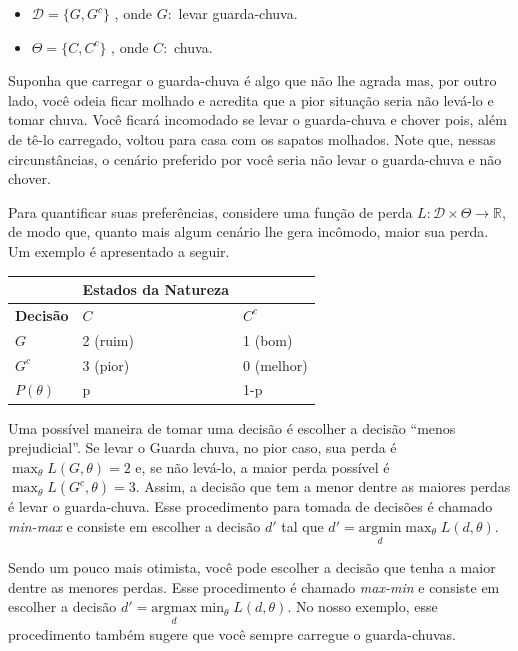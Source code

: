 \documentclass[
]{book}
\begin{document}
\begin{itemize}
\item
  \(\mathcal{D}=\{G,G^c\}\) , onde \(G:\) levar guarda-chuva.
\item
  \(\Theta=\{C,C^c\}\) , onde \(C:\) chuva.
\end{itemize}

Suponha que carregar o guarda-chuva é algo que não lhe agrada mas, por outro lado, você odeia ficar molhado e acredita que a pior situação seria não levá-lo e tomar chuva. Você ficará incomodado se levar o guarda-chuva e chover pois, além de tê-lo carregado, voltou para casa com os sapatos molhados. Note que, nessas circunstâncias, o cenário preferido por você seria não levar o guarda-chuva e não chover.

Para quantificar suas preferências, considere uma função de perda \(L:\mathcal{D}\times\Theta\longrightarrow\mathbb{R}\), de modo que, quanto mais algum cenário lhe gera incômodo, maior sua perda. Um exemplo é apresentado a seguir.

\begin{longtable}[]{@{}lll@{}}
\toprule
& Estados da Natureza & \\
\midrule
\endhead
\textbf{Decisão} & \(C\) & \(C^c\) \\
\(G\) & 2 (ruim) & 1 (bom) \\
\(G^c\) & 3 (pior) & 0 (melhor) \\
\(P(\theta)\) & p & 1-p \\
\bottomrule
\end{longtable}

Uma possível maneira de tomar uma decisão é escolher a decisão ``menos prejudicial''. Se levar o Guarda chuva, no pior caso, sua perda é \(\displaystyle \max_\theta L(G,\theta)=2\) e, se não levá-lo, a maior perda possível é \(\displaystyle \max_\theta L(G^c,\theta)=3\). Assim, a decisão que tem a menor dentre as maiores perdas é levar o guarda-chuva. Esse procedimento para tomada de decisões é chamado \emph{min-max} e consiste em escolher a decisão \(d'\) tal que \(d' = \displaystyle \underset{d}{\text{argmin}} \max_\theta L(d,\theta)\).

Sendo um pouco mais otimista, você pode escolher a decisão que tenha a maior dentre as menores perdas. Esse procedimento é chamado \emph{max-min} e consiste em escolher a decisão \(d' = \displaystyle \underset{d}{\text{argmax}} \min_\theta L(d,\theta)\). No nosso exemplo, esse procedimento também sugere que você sempre carregue o guarda-chuvas.
\end{document}
